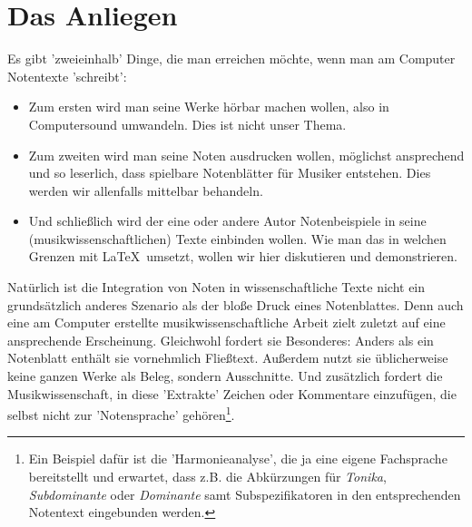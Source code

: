 %
%
%



\section{Das Anliegen}

Es gibt 'zweieinhalb' Dinge, die man erreichen möchte, wenn man am Computer
Notentexte 'schreibt':

\begin{itemize}
  \item Zum ersten wird man seine Werke hörbar machen wollen, also in
  Computersound umwandeln. Dies ist nicht unser Thema.
  \item Zum zweiten wird man seine Noten ausdrucken wollen, möglichst
  ansprechend und so leserlich, dass spielbare Notenblätter für Musiker
  entstehen. Dies werden wir allenfalls mittelbar behandeln.
  \item Und schließlich wird der eine oder andere Autor Notenbeispiele in seine
  (musikwissenschaftlichen) Texte einbinden wollen. Wie man das in welchen
  Grenzen mit \LaTeX\ umsetzt, wollen wir hier diskutieren und demonstrieren.
\end{itemize}

Natürlich ist die Integration von Noten in wissenschaftliche Texte nicht ein
grundsätzlich anderes Szenario als der bloße Druck eines Notenblattes.
Denn auch eine am Computer erstellte musikwissenschaftliche Arbeit zielt zuletzt
auf eine ansprechende Erscheinung. Gleichwohl fordert sie Besonderes: Anders als
ein Notenblatt enthält sie vornehmlich Fließtext. Außerdem nutzt sie
üblicherweise keine ganzen Werke als Beleg, sondern Ausschnitte. Und zusätzlich
fordert die Musikwissenschaft, in diese 'Extrakte' Zeichen oder Kommentare
einzufügen, die selbst nicht zur 'Notensprache' gehören\footnote{Ein Beispiel
dafür ist die 'Harmonieanalyse', die ja eine eigene Fachsprache bereitstellt und
erwartet, dass z.B. die Abkürzungen für \textit{Tonika}, \textit{Subdominante}
oder \textit{Dominante} samt Subspezifikatoren in den entsprechenden Notentext
eingebunden werden.}.

